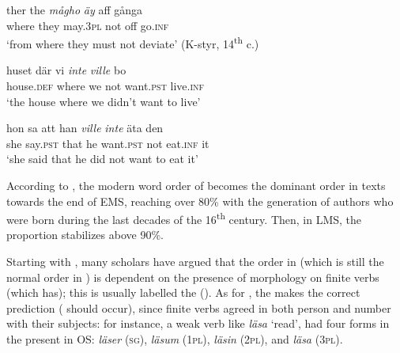 \documentclass[output=paper]{langscibook}
\begin{document}
\ea\label{ex:intro:5}
\ea\label{ex:intro:5a}
\gll  ther     the \textit{mågho} \textit{äy} aff   gånga                \\
where   they   may.3\textsc{pl}   not   off   go\textsc{.inf}\\
\glt ‘from where they must not deviate’ (K-styr, 14\textsuperscript{th} c.)


\ex\label{ex:intro:5b}
\gll  huset       där     vi \textit{inte} \textit{ville} {bo}\\
        house.\textsc{def}     where   we     not   want.\textsc{pst}  live.\textsc{inf}\\
\glt        ‘the house where we didn’t want to live’


\ex\label{ex:intro:5c}
\gll  hon   sa   att   han   \textit{ville}       \textit{inte}   äta     den    \\
        she         say.\textsc{pst} that he   want.\textsc{pst}  not   eat.\textsc{inf}  it\\
\glt         ‘she said that he did not want to eat it’
\z
\z

According to \citet[176]{Falk1993}, the modern  word order of  becomes the dominant order in  texts towards the end of EMS, reaching over 80\% with the generation of authors who were born during the last decades of the 16\textsuperscript{th} century. Then, in LMS, the proportion stabilizes above 90\%.



Starting with \citet{Kosmeijer1986}, many scholars have argued that the order in  (which is still the normal order in ) is dependent on the presence of  morphology on finite verbs (which  has); this is usually labelled the  (). As for , the  makes the correct prediction ( should occur), since finite verbs agreed in both person and number with their subjects: for instance, a weak verb like \textit{läsa} ‘read’, had four forms in the present  in OS: \textit{läser} (\textsc{sg}), \textit{läsum} (1\textsc{pl}), \textit{läsin} (2\textsc{pl}), and \textit{läsa} (3\textsc{pl}).
\end{document}

